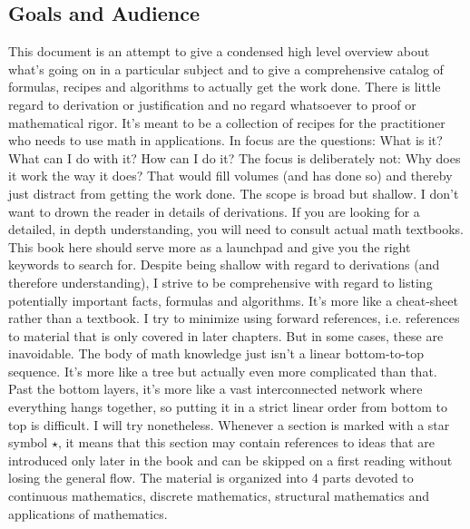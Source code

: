 
\subsection{Goals and Audience}
This document is an attempt to give a condensed high level overview about what's going on in a particular subject and to give a comprehensive catalog of formulas, recipes and algorithms to actually get the work done. There is little regard to derivation or justification and no regard whatsoever to proof or mathematical rigor. It's meant to be a collection of recipes for the practitioner who needs to use math in applications. In focus are the questions: What is it? What can I do with it? How can I do it? The focus is deliberately not: Why does it work the way it does? That would fill volumes (and has done so) and thereby just distract from getting the work done. The scope is broad but shallow. I don't want to drown the reader in details of derivations. If you are looking for a detailed, in depth understanding, you will need to consult actual math textbooks. This book here should serve more as a launchpad and give you the right keywords to search for.  Despite being shallow with regard to derivations (and therefore understanding), I strive to be comprehensive with regard to listing potentially important facts, formulas and algorithms. It's more like a cheat-sheet rather than a textbook. I try to minimize using forward references, i.e. references to material that is only covered in later chapters. But in some cases, these are inavoidable. The body of math knowledge just isn't a linear bottom-to-top sequence. It's more like a tree but actually even more complicated than that. Past the bottom layers, it's more like a vast interconnected network where everything hangs together, so putting it in a strict linear order from bottom to top is difficult. I will try nonetheless. Whenever a section is marked with a star symbol $\star$, it means that this section may contain references to ideas that are introduced only later in the book and can be skipped on a first reading without losing the general flow. The material is organized into 4 parts devoted to continuous mathematics, discrete mathematics, structural mathematics and applications of mathematics. 



